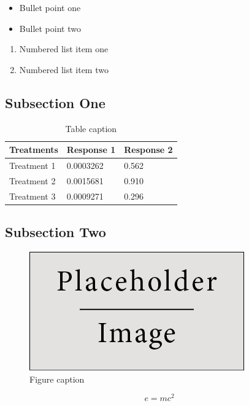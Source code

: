 \documentclass[review,12pt]{elsarticle}
\begin{document}
\blindtext

\begin{itemize}
\item Bullet point one
\item Bullet point two
\end{itemize}

\begin{enumerate}
\item Numbered list item one
\item Numbered list item two
\end{enumerate}

\subsection{Subsection One}

\blindtext

\begin{table}[h]
\centering
\begin{tabular}{l l l}
\hline
\textbf{Treatments} & \textbf{Response 1} & \textbf{Response 2}\\
\hline
Treatment 1 & 0.0003262 & 0.562 \\
Treatment 2 & 0.0015681 & 0.910 \\
Treatment 3 & 0.0009271 & 0.296 \\
\hline
\end{tabular}
\caption{Table caption}
\end{table}

\subsection{Subsection Two}

\blindtext

\begin{figure}[h]
\centering\includegraphics[width=0.4\linewidth]{placeholder}
\caption{Figure caption}
\end{figure}

\blindtext

\begin{equation}
\label{eq:emc}
e = mc^2
\end{equation}
\end{document}
